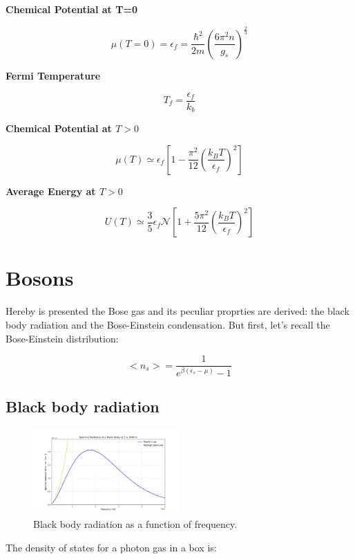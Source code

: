 \documentclass{article}
\begin{document}
\newpage
\begin{tcolorbox}[colframe=gray!90, colback=gray!5, coltitle=white, sharp corners, title=\textbf{Fermions, Summary}, fonttitle=\large\bfseries]
    \textbf{Chemical Potential at T=0}

    \begin{equation}
        \mu(T=0)=\epsilon_f=\frac{\hbar^2}{2m}\left(\frac{6\pi^2n}{g_s}\right)^{\frac{2}{3}}
    \end{equation}

    \textbf{Fermi Temperature}

    \begin{equation}
        T_f=\frac{\epsilon_f}{k_b}
    \end{equation}

    \textbf{Chemical Potential at $T>0$}

    \begin{equation}
        \mu(T)\simeq \epsilon_f\left[1-\frac{\pi^2}{12}\left(\frac{k_BT}{\epsilon_f}\right)^2\right]
    \end{equation}

    \textbf{Average Energy at $T>0$}

    \begin{equation}
        U(T)\simeq \frac{3}{5}\epsilon_f\mathcal{N}\left[1+\frac{5\pi^2}{12}\left(\frac{k_BT}{\epsilon_f}\right)^2\right]
    \end{equation}


\end{tcolorbox}
\newpage

\section{Bosons}

Hereby is presented the Bose gas and its peculiar proprties are derived:
the black body radiation and the Bose-Einstein condensation.
But first, let's recall the Bose-Einstein distribution:

\begin{equation}
    <n_s>=\frac{1}{e^{\beta(\epsilon_s-\mu)}-1}
\end{equation}


\subsection{Black body radiation}

\begin{figure}[h]
    \centering
    \includegraphics[width=0.5\textwidth]{images/black-body.png}
    \caption{Black body radiation as a function of frequency.}
    \label{fig:black-body-radiation}
\end{figure}
The density of states for a photon gas in a box is:
\end{document}
